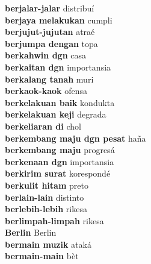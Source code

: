 \textbf{ berjalar-jalar  } distribuí \\
\textbf{ berjaya melakukan  } cumpli \\
\textbf{ berjujut-jujutan  } atraé \\
\textbf{ berjumpa dengan  } topa \\
\textbf{ berkahwin dgn  } casa \\
\textbf{ berkaitan dgn  } importansia \\
\textbf{ berkalang tanah  } muri \\
\textbf{ berkaok-kaok  } ofensa \\
\textbf{ berkelakuan baik  } kondukta \\
\textbf{ berkelakuan keji  } degrada \\
\textbf{ berkeliaran di  } chol \\
\textbf{ berkembang maju dgn pesat  } haña \\
\textbf{ berkembang maju  } progresá \\
\textbf{ berkenaan dgn  } importansia \\
\textbf{ berkirim surat  } korespondé \\
\textbf{ berkulit hitam  } preto \\
\textbf{ berlain-lain  } distinto \\
\textbf{ berlebih-lebih  } rikesa \\
\textbf{ berlimpah-limpah  } rikesa \\
\textbf{ Berlin  } Berlin \\
\textbf{ bermain muzik  } ataká \\
\textbf{ bermain-main  } bèt \\
